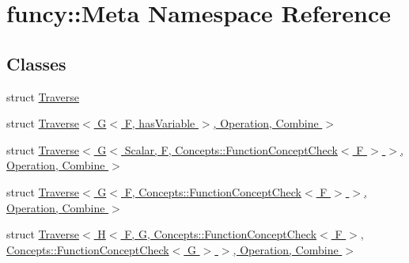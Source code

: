 \hypertarget{namespacefuncy_1_1Meta}{\section{funcy\-:\-:Meta Namespace Reference}
\label{namespacefuncy_1_1Meta}
}
\subsection*{Classes}
\begin{DoxyCompactItemize}
\item 
struct \hyperlink{structfuncy_1_1Meta_1_1Traverse}{Traverse}
\item 
struct \hyperlink{structfuncy_1_1Meta_1_1Traverse_3_01G_3_01F_00_01hasVariable_01_4_00_01Operation_00_01Combine_01_4}{Traverse$<$ G$<$ F, has\-Variable $>$, Operation, Combine $>$}
\item 
struct \hyperlink{structfuncy_1_1Meta_1_1Traverse_3_01G_3_01Scalar_00_01F_00_01Concepts_1_1FunctionConceptCheck_3_d9950d1c48a2813691c7a0d506636e4e}{Traverse$<$ G$<$ Scalar, F, Concepts\-::\-Function\-Concept\-Check$<$ F $>$ $>$, Operation, Combine $>$}
\item 
struct \hyperlink{structfuncy_1_1Meta_1_1Traverse_3_01G_3_01F_00_01Concepts_1_1FunctionConceptCheck_3_01F_01_4_01_44008b3cc655196582c54171c951cc7a}{Traverse$<$ G$<$ F, Concepts\-::\-Function\-Concept\-Check$<$ F $>$ $>$, Operation, Combine $>$}
\item 
struct \hyperlink{structfuncy_1_1Meta_1_1Traverse_3_01H_3_01F_00_01G_00_01Concepts_1_1FunctionConceptCheck_3_01F_084070fc36daa4be3c051d8e83d53a122}{Traverse$<$ H$<$ F, G, Concepts\-::\-Function\-Concept\-Check$<$ F $>$, Concepts\-::\-Function\-Concept\-Check$<$ G $>$ $>$, Operation, Combine $>$}
\end{DoxyCompactItemize}
